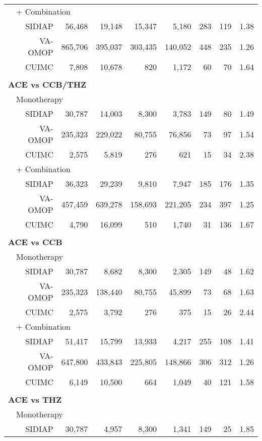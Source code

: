 \documentclass[11pt,]{article}
\begin{document}
\begin{longtable}{p{-2em}p{-2em}rrrrrrrr}
                           & \multicolumn{8}{l}{+ Combination} \\ &  & SIDIAP & 56,468 & 19,148 & 15,347 & 5,180 & 283 & 119 & 1.38 \\ 
   &  & VA-OMOP & 865,706 & 395,037 & 303,435 & 140,052 & 448 & 235 & 1.26 \\ 
   &  & CUIMC & 7,808 & 10,678 & 820 & 1,172 & 60 & 70 & 1.64 \\ 
   \rowcolor{white} \\ \multicolumn{9}{l}{\textbf{ACE vs CCB/THZ}} \\ & \multicolumn{9}{l}{Monotherapy}  \\ &  & SIDIAP & 30,787 & 14,003 & 8,300 & 3,783 & 149 & 80 & 1.49 \\ 
   &  & VA-OMOP & 235,323 & 229,022 & 80,755 & 76,856 & 73 & 97 & 1.54 \\ 
   &  & CUIMC & 2,575 & 5,819 & 276 & 621 & 15 & 34 & 2.38 \\ 
                           & \multicolumn{8}{l}{+ Combination} \\ &  & SIDIAP & 36,323 & 29,239 & 9,810 & 7,947 & 185 & 176 & 1.35 \\ 
   &  & VA-OMOP & 457,459 & 639,278 & 158,693 & 221,205 & 234 & 397 & 1.25 \\ 
   &  & CUIMC & 4,790 & 16,099 & 510 & 1,740 & 31 & 136 & 1.67 \\ 
   \rowcolor{white} \\ \multicolumn{9}{l}{\textbf{ACE vs CCB}} \\ & \multicolumn{9}{l}{Monotherapy}  \\ &  & SIDIAP & 30,787 & 8,682 & 8,300 & 2,305 & 149 & 48 & 1.62 \\ 
   &  & VA-OMOP & 235,323 & 138,440 & 80,755 & 45,899 & 73 & 68 & 1.63 \\ 
   &  & CUIMC & 2,575 & 3,792 & 276 & 375 & 15 & 26 & 2.44 \\ 
                           & \multicolumn{8}{l}{+ Combination} \\ &  & SIDIAP & 51,417 & 15,799 & 13,933 & 4,217 & 255 & 108 & 1.41 \\ 
   &  & VA-OMOP & 647,800 & 433,843 & 225,805 & 148,866 & 306 & 312 & 1.26 \\ 
   &  & CUIMC & 6,149 & 10,500 & 664 & 1,049 & 40 & 121 & 1.58 \\ 
   \rowcolor{white} \\ \multicolumn{9}{l}{\textbf{ACE vs THZ}} \\ & \multicolumn{9}{l}{Monotherapy}  \\ &  & SIDIAP & 30,787 & 4,957 & 8,300 & 1,341 & 149 & 25 & 1.85 \\ 

\end{longtable}
\end{document}
